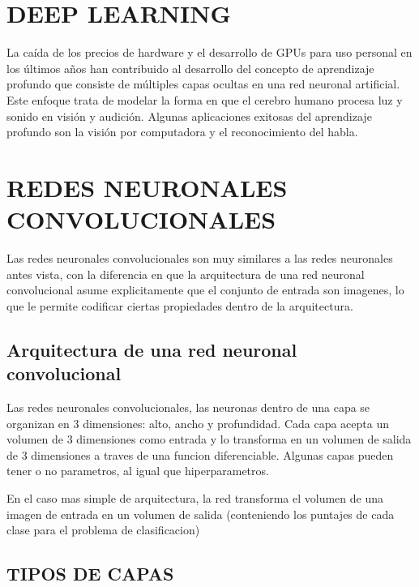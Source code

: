 \documentclass[a4paper,12pt,spanish]{book}
\begin{document}
  \section {DEEP LEARNING}
    La caída de los precios de hardware y el desarrollo de GPUs para uso personal en los últimos años han contribuido al desarrollo del concepto de aprendizaje profundo que consiste
    de múltiples capas ocultas en una red neuronal artificial. Este enfoque trata de modelar la forma en que el cerebro humano procesa luz y sonido en visión y audición.
    Algunas aplicaciones exitosas del aprendizaje profundo son la visión por computadora y el reconocimiento del habla.

  \section {REDES NEURONALES CONVOLUCIONALES}
    Las redes neuronales convolucionales son muy similares a las redes neuronales antes vista, con la diferencia en que la arquitectura de una red neuronal convolucional asume explicitamente
    que el conjunto de entrada son imagenes, lo que le permite codificar ciertas propiedades dentro de la arquitectura.

    \subsection {Arquitectura de una red neuronal convolucional}
      Las redes neuronales convolucionales, las neuronas dentro de una capa se organizan en 3 dimensiones: alto, ancho y profundidad.
      Cada capa acepta un volumen de 3 dimensiones como entrada y lo transforma en un volumen de salida de 3 dimensiones a traves de una funcion diferenciable.
      Algunas capas pueden tener o no parametros, al igual que hiperparametros.

      En el caso mas simple de arquitectura, la red transforma el volumen de una imagen de entrada en un volumen de salida (conteniendo los puntajes de cada clase para el problema de clasificacion)

    \subsection {TIPOS DE CAPAS}
\end{document}
